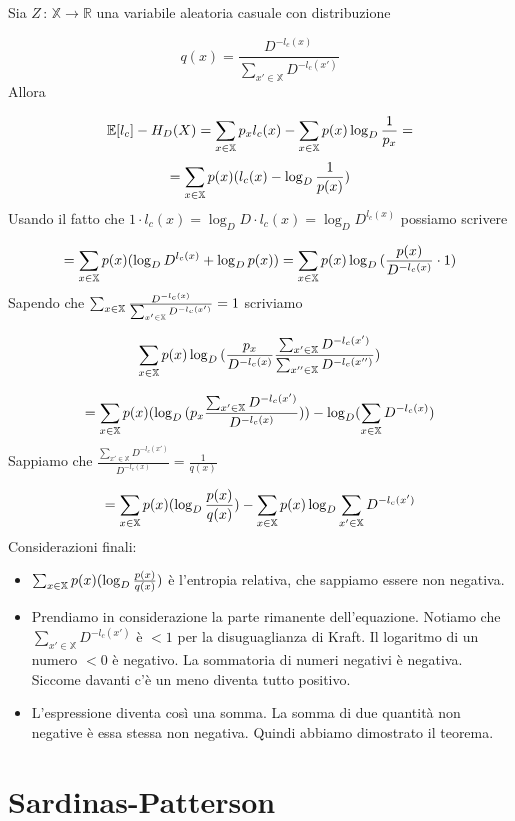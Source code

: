 \documentclass[12pt]{report}
\begin{document}
    \begin{dimo}
        Sia $Z\,:\, \mathbb{X} \rightarrow \mathbb{R}$ una variabile aleatoria casuale con distribuzione

        $$q(x) = \frac{D^{-l_c(x)}}{\sum_{x' \in \mathbb{X} } D^{-l_c(x')}}$$
        Allora

        $$\mathbb{E}[l_c] - H_D(X) = \sum_{x \in \mathbb{X}} p_x l_c(x) - \sum_{x \in \mathbb{X}} p(x) \log_D{\frac{1}{p_x}} =$$
        $$= \sum_{x \in \mathbb{X}} p(x)(l_c(x) - \log_D{\frac{1}{p(x)}})$$
        Usando il fatto che $1 \cdot l_c(x) = \log_D{D} \cdot l_c(x) = \log_D{D^{l_c(x)}}$ possiamo scrivere

        $$= \sum_{x \in \mathbb{X}} p(x) (\log_D{D^{l_c(x)}} + \log_D{p(x)}) = \sum_{x \in \mathbb{X}} p(x) \log_D{(\frac{p(x)}{D^{-l_c(x)}} \cdot 1)}$$
        Sapendo che $\sum_{x \in \mathbb{X}} \frac{D^{-l_c(x)}}{\sum_{x' \in \mathbb{X}} D^{-l_c(x')}} = 1$ scriviamo

        $$\sum_{x \in \mathbb{X}} p(x) \log_D{(\frac{p_x}{D^{-l_c(x)}} \frac{ \sum_{x' \in \mathbb{X}} D^{-l_c(x')}}{\sum_{x'' \in \mathbb{X}} D^{-l_c(x'')}})}$$

        $$=  \sum_{x \in \mathbb{X}} p(x) (\log_D{(p_x \frac{\sum_{x' \in \mathbb{X} } D^{-l_c(x')}}{D^{-l_c(x)}})}) - \log_D(\sum_{x \in \mathbb{X}} D^{-l_c(x)})$$
        Sappiamo che $\frac{\sum_{x' \in \mathbb{X} } D^{-l_c(x')}} {D^{-l_c(x)}}= \frac{1}{q(x)}$

        $$= \sum_{x \in \mathbb{X}} p(x) (\log_D{\frac{p(x)}{q(x)}}) - \sum_{x \in \mathbb{X}} p(x) \log_D{\sum_{x' \in \mathbb{X}} D^{-l_c(x')}}$$
        Considerazioni finali:

        \begin{itemize}
            \item $\sum_{x \in \mathbb{X}} p(x) (\log_D{\frac{p(x)}{q(x)}})$ è l'entropia relativa, che sappiamo essere non negativa.
            \item Prendiamo in considerazione la parte rimanente dell'equazione. Notiamo che $\sum_{x' \in \mathbb{X}} D^{-l_c(x')}$ è $<1$ per la disuguaglianza di Kraft. Il logaritmo di un numero $<0$ è negativo. La sommatoria di numeri negativi è negativa. Siccome davanti c'è un meno diventa tutto positivo.
            \item L'espressione diventa così una somma. La somma di due quantità non negative è essa stessa non negativa. Quindi abbiamo dimostrato il teorema.
        \end{itemize}
    \end{dimo}


    \section{Sardinas-Patterson}
\end{document}
